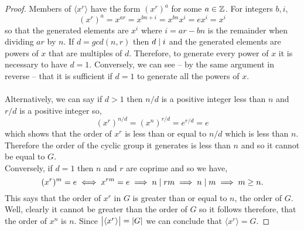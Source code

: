 \documentclass[MathsNotesBase.tex]{subfiles}
\begin{document}
{	
	\begin{proof}
		Members of ${ \langle x^r \rangle }$ have the form ${ (x^r)^a }$ for some ${ a \in \mathbb{Z}^{} }$. For integers ${ b,i }$,
		\[ (x^r)^a = x^{ar} = x^{bn + i} = x^{bn}x^i = ex^i = x^i \]
		so that the generated elements are ${ x^i }$ where ${ i = ar - bn }$ is the remainder when dividing $ar$ by $n$. If ${ d = gcd(n,r) }$ then ${ d \mid i }$ and the generated elements are powers of $x$ that are multiples of $d$. Therefore, to generate every power of $x$ it is necessary to have ${ d = 1 }$. Conversely, we can see -- by the same argument in reverse -- that it is sufficient if ${ d = 1 }$ to generate all the powers of $x$.\\\\
		Alternatively, we can say if ${ d > 1 }$ then ${ n/d }$ is a positive integer less than $n$ and ${ r/d }$ is a positive integer so,
		\[ (x^r)^{n/d} = (x^n)^{r/d} = e^{r/d} = e \]
		which shows that the order of $x^r$ is less than or equal to ${ n/d }$ which is less than $n$. Therefore the order of the cyclic group it generates is less than $n$ and so it cannot be equal to $G$.\\
		Conversely, if ${ d = 1 }$ then $n$ and $r$ are coprime and so we have,
		\[ (x^r)^m = e \iff x^{rm} = e \implies n \mid rm \implies n \mid m \implies m \geq n. \]
		This says that the order of ${ x^r }$ in $G$ is greater than or equal to $n$, the order of $G$. Well, clearly it cannot be greater than the order of $G$ so it follows therefore, that the order of $x^n$ is $n$. Since ${ \left\lvert\langle x^r \rangle\right\rvert = \left\lvert G\right\rvert }$ we can conclude that ${ \langle x^r \rangle = G }$.
	\end{proof}

}
\end{document}
